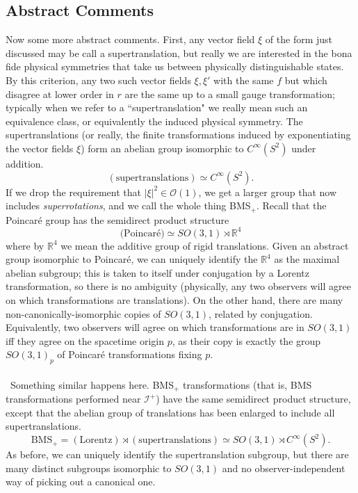 \documentclass[11pt,letterpaper]{article}
\newcommand{\mc}[1]{\mathcal{#1}}
\newcommand{\R}{\mathbb{R}}
\begin{document}
\subsection{Abstract Comments}
Now some more abstract comments. First, any vector field $\xi$ of the form just discussed may be call a supertranslation, but really we are interested in the bona fide physical symmetries that take us between physically distinguishable states. By this criterion, any two such vector fields $\xi, \xi'$ with the same $f$ but which disagree at lower order in $r$ are the same up to a small gauge transformation; typically when we refer to a ``supertranslation" we really mean such an equivalence class, or equivalently the induced physical symmetry. The supertranslations (or really, the finite transformations induced by exponentiating the vector fields $\xi$) form an abelian group isomorphic to $C^\infty(S^2)$ under addition. \begin{equation}
(\mbox{supertranslations}) \simeq C^\infty(S^2).
\end{equation} 
If we drop the requirement that $|\xi|^2 \in \mc{O}(1)$, we get a larger group that now includes \textit{superrotations}, and we call the whole thing BMS$_+$. Recall that the Poincar\'{e} group has the semidirect product structure \begin{equation}
\mbox{(Poincar\'{e})} \simeq SO(3,1) \rtimes \R^4
\end{equation}
where by $\R^4$ we mean the additive group of rigid translations. Given an abstract group isomorphic to Poincar\'{e}, we can uniquely identify the $\R^4$ as the maximal abelian subgroup; this is taken to itself under conjugation by a Lorentz transformation, so there is no ambiguity (physically, any two observers will agree on which transformations are translations). On the other hand, there are many non-canonically-isomorphic copies of $SO(3,1)$, related by conjugation. Equivalently, two observers will agree on which transformations are in $SO(3,1)$ iff they agree on the spacetime origin $p$, as their copy is exactly the group $SO(3,1)_p$ of Poincar\'{e} transformations fixing $p$.\\
\\
\
Something similar happens here. BMS$_+$ transformations (that is, BMS transformations performed near $\mc{I}^+$) have the same semidirect product structure, except that the abelian group of translations has been enlarged to include all supertranslations. \begin{equation}
\mbox{BMS}_+ = (\mbox{Lorentz}) \rtimes (\mbox{supertranslations}) \simeq SO(3,1) \rtimes C^\infty(S^2).
\end{equation}
As before, we can uniquely identify the supertranslation subgroup, but there are many distinct subgroups isomorphic to $SO(3,1)$ and no observer-independent way of picking out a canonical one.
\end{document}
